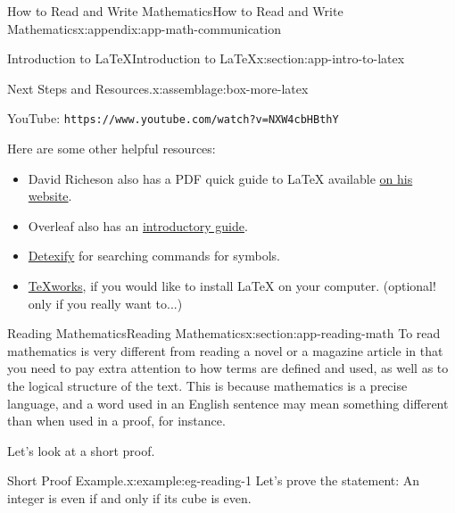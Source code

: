 \documentclass[oneside,10pt,]{book}
\newcommand{\mono}[1]{\texttt{#1}}
\numberwithin{equation}{section}
\newlength{\qrsize}
\newlength{\previewwidth}
\begin{document}
\begin{appendixptx}{How to Read and Write Mathematics}{}{How to Read and Write Mathematics}{}{}{x:appendix:app-math-communication}
\begin{sectionptx}{Introduction to \LaTeX{}}{}{Introduction to \LaTeX{}}{}{}{x:section:app-intro-to-latex}
\begin{assemblage}{Next Steps and Resources.}{x:assemblage:box-more-latex}
\begin{sidebyside}{1}{0}{0}{0}
\begin{sbspanel}{1}
\begin{tcbraster}[raster columns=2, raster column skip=1pt, raster halign=center, raster force size=false, raster left skip=0pt, raster right skip=0pt]
\begin{tcolorbox}[previewstyle, width=\previewwidth]
\end{tcolorbox}%
\begin{tcolorbox}[qrstyle]%
{\hypersetup{urlcolor=black}}%
\end{tcolorbox}%
\begin{tcolorbox}[captionstyle]%
\small YouTube: \mono{https://www.youtube.com/watch?v=NXW4cbHBthY}\end{tcolorbox}%
\end{tcbraster}%
\end{sbspanel}%
\end{sidebyside}%
\par
Here are some other helpful resources:%
\begin{itemize}[label=\textbullet]
\item{}David Richeson also has a PDF quick guide to \LaTeX{} available \href{https://divisbyzero.com/teaching/a-quick-guide-to-latex/}{on his website}.%
\item{}Overleaf also has an \href{https://www.overleaf.com/learn/latex/Learn_LaTeX_in_30_minutes}{introductory guide}.%
\item{}\href{https://detexify.kirelabs.org/classify.html}{Detexify} for searching commands for symbols.%
\item{}\href{http://www.tug.org/texworks/}{TeXworks}, if you would like to install \LaTeX{} on your computer. (optional! only if you really want to...)%
\end{itemize}
%
\end{assemblage}
\end{sectionptx}
%
%
\typeout{************************************************}
\typeout{************************************************}
%
\begin{sectionptx}{Reading Mathematics}{}{Reading Mathematics}{}{}{x:section:app-reading-math}
To read mathematics is very different from reading a novel or a magazine article in that you need to pay extra attention to how terms are defined and used, as well as to the logical structure of the text. This is because mathematics is a precise language, and a word used in an English sentence may mean something different than when used in a proof, for instance.%
\par
Let's look at a short proof.%
\begin{example}{Short Proof Example.}{x:example:eg-reading-1}%
Let's prove the statement: An integer is even if and only if its cube is even.%
\par

\end{example}
\end{sectionptx}
\end{appendixptx}
\end{document}
